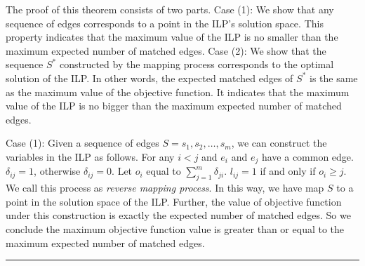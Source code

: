 \documentclass[letterpaper]{article}
\newenvironment{proof}{{Proof:}}{\hfill\rule{2mm}{2mm}}
\begin{document}
\begin{proof}
	The proof of this theorem consists of two parts. Case (1): We show that any sequence of edges corresponds to a point in the ILP's solution space. This property indicates that the maximum value of the ILP is no smaller than the maximum expected number of matched edges.
	Case (2): We show that the sequence $S^*$ constructed by the mapping process corresponds to the optimal solution of the ILP.
	In other words, the expected matched edges of $S^*$ is the same as the maximum value of the objective function. It indicates that the maximum value of the ILP is no bigger than the maximum expected number of matched edges.
	
	Case (1): Given a sequence of edges $S=s_1,s_2,\ldots,s_m$, we can construct the variables in the ILP as follows.
	For any $i<j$ and $e_i$ and $e_j$ have a common edge. $\delta_{ij}=1$, otherwise $\delta_{ij}=0$.
	Let $o_i$ equal to $\sum_{j=1}^{m}\delta_{ji}$.
	$l_{ij}=1$ if and only if $o_i\geq j$.
	We call this process as \textit{reverse mapping process}.
	In this way, we have map $S$ to a point in the solution space of the ILP. 
	Further, the value of objective function under this construction is exactly the expected number of matched edges.
	So we conclude the maximum objective function value is greater than or equal to the maximum expected number of matched edges.
	

\end{proof}
\end{document}

